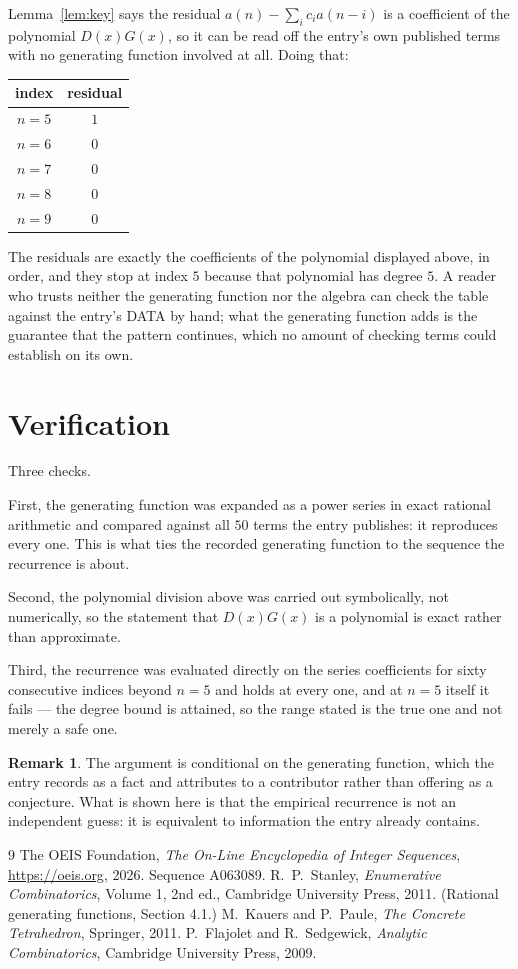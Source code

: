 \documentclass[11pt,a4paper]{article}
\theoremstyle{plain}
\theoremstyle{definition}
\newtheorem{remark}[theorem]{Remark}
\begin{document}
Lemma~\ref{lem:key} says the residual $a(n)-\sum_ic_ia(n-i)$ is a coefficient of the
polynomial $D(x)G(x)$, so it can be read off the entry's own published terms with no
generating function involved at all. Doing that:
\begin{center}
\begin{tabular}{cc}
index & residual \\ \hline
$n=5$ & $1$ \\
$n=6$ & $0$ \\
$n=7$ & $0$ \\
$n=8$ & $0$ \\
$n=9$ & $0$
\end{tabular}
\end{center}
The residuals are exactly the coefficients of the polynomial displayed above, in order, and
they stop at index $5$ because that polynomial has degree $5$. A reader who trusts
neither the generating function nor the algebra can check the table against the entry's DATA
by hand; what the generating function adds is the guarantee that the pattern continues, which
no amount of checking terms could establish on its own.

\section{Verification}

Three checks.

First, the generating function was expanded as a power series in exact rational arithmetic and
compared against all $50$ terms the entry publishes: it reproduces every one. This is
what ties the recorded generating function to the sequence the recurrence is about.

Second, the polynomial division above was carried out symbolically, not numerically, so the
statement that $D(x)G(x)$ is a polynomial is exact rather than approximate.

Third, the recurrence was evaluated directly on the series coefficients for sixty consecutive
indices beyond $n=5$ and holds at every one, and at $n=5$ itself it fails --- the
degree bound is attained, so the range stated is the true one and not merely a safe one.

\begin{remark}
The argument is conditional on the generating function, which the entry records as a fact and
attributes to a contributor rather than offering as a conjecture. What is shown here is that
the empirical recurrence is not an independent guess: it is equivalent to information the
entry already contains.
\end{remark}

\begin{thebibliography}{9}
 The OEIS Foundation, \emph{The On-Line Encyclopedia of Integer
Sequences}, \url{https://oeis.org}, 2026. Sequence A063089.
 R.~P.~Stanley, \emph{Enumerative Combinatorics}, Volume 1, 2nd ed.,
Cambridge University Press, 2011. (Rational generating functions, Section 4.1.)
 M.~Kauers and P.~Paule, \emph{The Concrete Tetrahedron}, Springer, 2011.
 P.~Flajolet and R.~Sedgewick, \emph{Analytic Combinatorics}, Cambridge
University Press, 2009.
\end{thebibliography}
\end{document}

